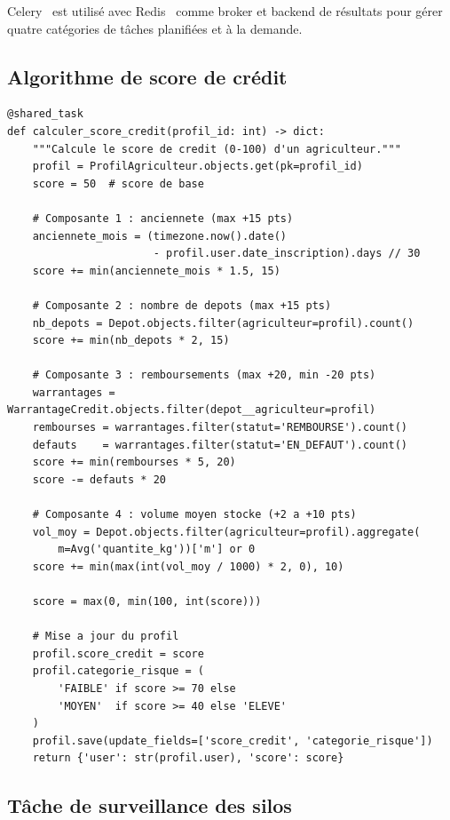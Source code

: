 \documentclass[12pt,a4paper,twoside]{report}
\begin{document}
Celery~\cite{celery2024docs} est utilisé avec Redis~\cite{redis2024docs}
comme broker et backend de résultats pour gérer quatre catégories de tâches
planifiées et à la demande.

\subsection{Algorithme de score de crédit}

\begin{lstlisting}[style=pythonstyle, caption={Tâche \texttt{calculer\_score\_credit()} --- \texttt{apps/intelligence/tasks.py}}]
@shared_task
def calculer_score_credit(profil_id: int) -> dict:
    """Calcule le score de credit (0-100) d'un agriculteur."""
    profil = ProfilAgriculteur.objects.get(pk=profil_id)
    score = 50  # score de base

    # Composante 1 : anciennete (max +15 pts)
    anciennete_mois = (timezone.now().date()
                       - profil.user.date_inscription).days // 30
    score += min(anciennete_mois * 1.5, 15)

    # Composante 2 : nombre de depots (max +15 pts)
    nb_depots = Depot.objects.filter(agriculteur=profil).count()
    score += min(nb_depots * 2, 15)

    # Composante 3 : remboursements (max +20, min -20 pts)
    warrantages = WarrantageCredit.objects.filter(depot__agriculteur=profil)
    rembourses = warrantages.filter(statut='REMBOURSE').count()
    defauts    = warrantages.filter(statut='EN_DEFAUT').count()
    score += min(rembourses * 5, 20)
    score -= defauts * 20

    # Composante 4 : volume moyen stocke (+2 a +10 pts)
    vol_moy = Depot.objects.filter(agriculteur=profil).aggregate(
        m=Avg('quantite_kg'))['m'] or 0
    score += min(max(int(vol_moy / 1000) * 2, 0), 10)

    score = max(0, min(100, int(score)))

    # Mise a jour du profil
    profil.score_credit = score
    profil.categorie_risque = (
        'FAIBLE' if score >= 70 else
        'MOYEN'  if score >= 40 else 'ELEVE'
    )
    profil.save(update_fields=['score_credit', 'categorie_risque'])
    return {'user': str(profil.user), 'score': score}
\end{lstlisting}

\subsection{Tâche de surveillance des silos}
\end{document}
